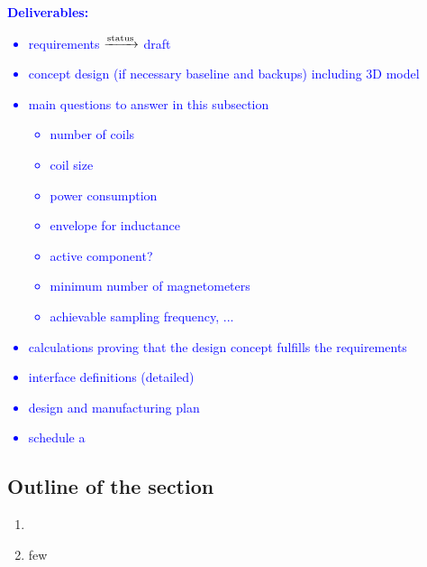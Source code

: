 \textcolor{blue}{
\textbf{Deliverables:}
\begin{itemize}
\item requirements $\xrightarrow{\rm status}$ draft
\item concept design (if necessary baseline and backups) including 3D model
\item main questions to answer in this subsection
    \begin{itemize}
    \item number of coils
    \item coil size
    \item power consumption
    \item envelope for inductance
    \item active component?
    \item minimum number of magnetometers
    \item achievable sampling frequency, ...
    \end{itemize}
\item calculations proving that the design concept fulfills the requirements 
\item interface definitions (detailed)
\item design and manufacturing plan
\item schedule
a\end{itemize}
}
\subsection*{Outline of the section}
 \begin{enumerate}
 \item 
 \item few
 
 \end{enumerate}
 

